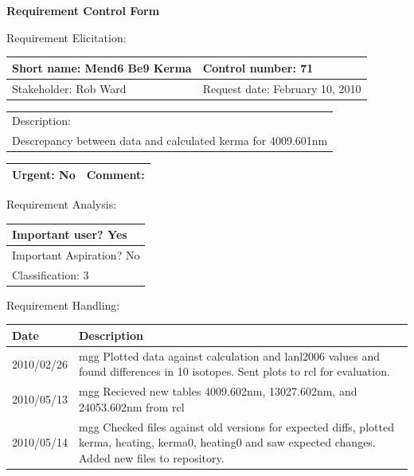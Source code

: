 \begin{center}\Large\bf
Requirement Control Form
\end{center}
\vspace{24pt}

Requirement Elicitation:

\begin{tabular}{|p{211pt}|p{211pt}|} \hline
Short name: Mend6 Be9 Kerma & Control number: 71\\ \hline
Stakeholder: Rob Ward & Request date: February 10, 2010\\
\end{tabular}
\begin{tabular}{|p{433pt}|} \hline
Description: \\ 
Descrepancy between data and calculated kerma for 4009.601nm
\\ \hline
\end{tabular} 
\begin{tabular}{|p{211pt}|p{211pt}|} \hline
Urgent: No & Comment:
\\ \hline
\end{tabular}

\vspace{24pt}

Requirement Analysis:

\begin{tabular}{|p{433pt}|} \hline
Important user? Yes \\ \hline
Important Aspiration? No \\ \hline
Classification: 3 \\ \hline
\end{tabular}
\vspace{24pt}

Requirement Handling:

\begin{tabular}{|p{72pt}|p{351pt}|} \hline
Date & Description \\ \hline
2010/02/26 & mgg Plotted data against calculation and lanl2006 values
and found differences in 10 isotopes.  Sent plots to rcl for
evaluation. \\ \hline
2010/05/13 & mgg Recieved new tables 4009.602nm, 13027.602nm, and
24053.602nm from rcl \\ \hline
2010/05/14 & mgg Checked files against old versions for expected
diffs, plotted kerma, heating, kerma0, heating0 and saw expected
changes.  Added new files to repository. \\ \hline
\end{tabular}

